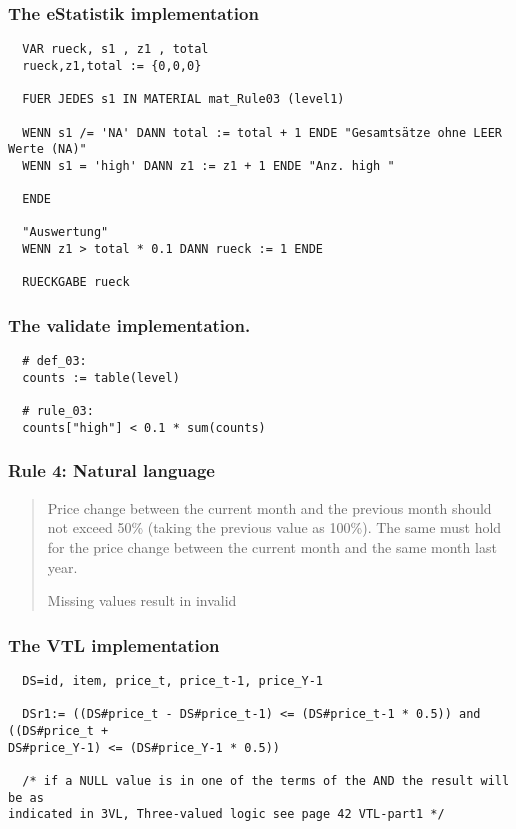 \subsubsection*{The eStatistik implementation}
\begin{verbatim}
  VAR rueck, s1 , z1 , total
  rueck,z1,total := {0,0,0}

  FUER JEDES s1 IN MATERIAL mat_Rule03 (level1)

  WENN s1 /= 'NA' DANN total := total + 1 ENDE "Gesamtsätze ohne LEER Werte (NA)"
  WENN s1 = 'high' DANN z1 := z1 + 1 ENDE "Anz. high "

  ENDE

  "Auswertung"
  WENN z1 > total * 0.1 DANN rueck := 1 ENDE

  RUECKGABE rueck
\end{verbatim}
\subsubsection*{The validate implementation.}
\begin{verbatim}
  # def_03:
  counts := table(level)

  # rule_03:
  counts["high"] < 0.1 * sum(counts)
\end{verbatim}


\newpage

\subsubsection*{  Rule 4: Natural language}
\begin{quote}


Price change between the current month and the previous month should not exceed 50\% (taking the previous value as 100\%). The same must hold for the price change between the current month and the same month last year.

Missing values result in invalid



\end{quote}
\subsubsection*{The VTL implementation}
\begin{verbatim}
  DS=id, item, price_t, price_t-1, price_Y-1

  DSr1:= ((DS#price_t - DS#price_t-1) <= (DS#price_t-1 * 0.5)) and ((DS#price_t +
DS#price_Y-1) <= (DS#price_Y-1 * 0.5))

  /* if a NULL value is in one of the terms of the AND the result will be as
indicated in 3VL, Three-valued logic see page 42 VTL-part1 */
\end{verbatim}
